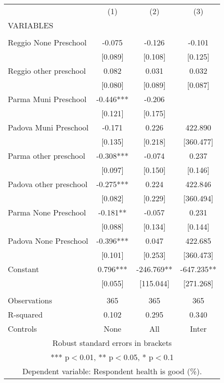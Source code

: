 \begin{tabular}{lccc} \hline
 & (1) & (2) & (3) \\
VARIABLES &  &  &  \\ \hline
 &  &  &  \\
Reggio None Preschool & -0.075 & -0.126 & -0.101 \\
 & [0.089] & [0.108] & [0.125] \\
Reggio other preschool & 0.082 & 0.031 & 0.032 \\
 & [0.080] & [0.089] & [0.087] \\
Parma Muni Preschool & -0.446*** & -0.206 &  \\
 & [0.121] & [0.175] &  \\
Padova Muni Preschool & -0.171 & 0.226 & 422.890 \\
 & [0.135] & [0.218] & [360.477] \\
Parma other preschool & -0.308*** & -0.074 & 0.237 \\
 & [0.097] & [0.150] & [0.146] \\
Padova other preschool & -0.275*** & 0.224 & 422.846 \\
 & [0.082] & [0.229] & [360.494] \\
Parma None Preschool & -0.181** & -0.057 & 0.231 \\
 & [0.088] & [0.134] & [0.144] \\
Padova None Preschool & -0.396*** & 0.047 & 422.685 \\
 & [0.101] & [0.253] & [360.473] \\
Constant & 0.796*** & -246.769** & -647.235** \\
 & [0.055] & [115.044] & [271.268] \\
 &  &  &  \\
Observations & 365 & 365 & 365 \\
R-squared & 0.102 & 0.295 & 0.340 \\
 Controls & None & All & Inter \\ \hline
\multicolumn{4}{c}{ Robust standard errors in brackets} \\
\multicolumn{4}{c}{ *** p$<$0.01, ** p$<$0.05, * p$<$0.1} \\
\multicolumn{4}{c}{ Dependent variable: Respondent health is good (\%).} \\
\end{tabular}
